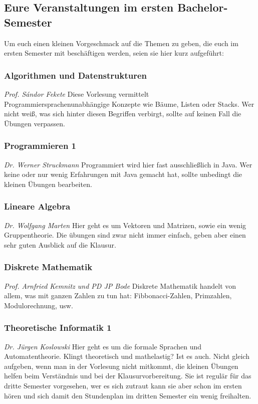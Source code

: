 \begin{multicols}{2}
\subsection{Eure Veranstaltungen im ersten Bachelor-Semester}
	Um euch einen kleinen Vorgeschmack auf die Themen zu geben, die euch im ersten Semester mit beschäftigen werden, seien sie hier kurz aufgeführt:

\subsubsection{Algorithmen und Datenstrukturen}
	\textit{Prof. S\'andor Fekete}
	Diese Vorlesung vermittelt Programmiersprachenunabhängige Konzepte wie Bäume, Listen oder Stacks. Wer nicht weiß, was sich hinter diesen Begriffen verbirgt, sollte auf keinen Fall die Übungen verpassen.

\subsubsection{Programmieren 1}
	\textit{Dr. Werner Struckmann}
	Programmiert wird hier fast ausschließlich in Java. Wer keine oder nur wenig Erfahrungen mit Java gemacht hat, sollte unbedingt die kleinen Übungen bearbeiten.

\subsubsection{Lineare Algebra}
	\textit{Dr. Wolfgang Marten}
	Hier geht es um Vektoren und Matrizen, sowie ein wenig Gruppentheorie. Die übungen sind zwar nicht immer einfach, geben aber einen sehr guten Ausblick auf die Klausur.


\subsubsection{Diskrete Mathematik}
	\textit{Prof. Arnfried Kemnitz und PD JP Bode}
	Diskrete Mathematik handelt von allem, was mit ganzen Zahlen zu tun hat: Fibbonacci-Zahlen, Primzahlen, Modulorechnung, usw. 
\subsubsection{Theoretische Informatik 1}
	\textit{Dr. Jürgen Koslowski}
	Hier geht es um die formale Sprachen und Automatentheorie.
	Klingt theoretisch und mathelastig? Ist es auch. Nicht gleich
	aufgeben, wenn man in der Vorlesung nicht mitkommt, die kleinen
	Übungen helfen beim Verständnis und bei der Klausurvorbereitung.
	Sie ist regulär für das dritte Semester vorgesehen, wer es sich
	zutraut kann sie aber schon im ersten hören und sich damit den
	Stundenplan im dritten Semester ein wenig freihalten. 
\end{multicols}
